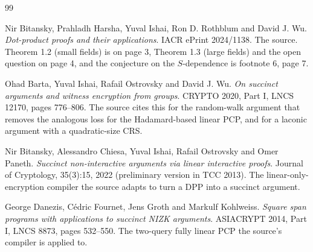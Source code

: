\documentclass{aicr-conjecture}
\begin{document}
\begin{aicrbibliography}{99}

Nir Bitansky, Prahladh Harsha, Yuval Ishai, Ron D. Rothblum and
David J. Wu.
\emph{Dot-product proofs and their applications}.
IACR ePrint 2024/1138.
The source. Theorem 1.2 (small fields) is on page 3, Theorem 1.3 (large
fields) and the open question on page 4, and the conjecture on the
$S$-dependence is footnote 6, page 7.

Ohad Barta, Yuval Ishai, Rafail Ostrovsky and David J. Wu.
\emph{On succinct arguments and witness encryption from groups}.
CRYPTO 2020, Part I, LNCS 12170, pages 776--806.
The source cites this for the random-walk argument that removes the
analogous loss for the Hadamard-based linear PCP, and for a laconic
argument with a quadratic-size CRS\@.

Nir Bitansky, Alessandro Chiesa, Yuval Ishai, Rafail Ostrovsky and Omer
Paneth.
\emph{Succinct non-interactive arguments via linear interactive proofs}.
Journal of Cryptology, 35(3):15, 2022 (preliminary version in TCC 2013).
The linear-only-encryption compiler the source adapts to turn a DPP into
a succinct argument.

George Danezis, C\'edric Fournet, Jens Groth and Markulf Kohlweiss.
\emph{Square span programs with applications to succinct NIZK
arguments}.
ASIACRYPT 2014, Part I, LNCS 8873, pages 532--550.
The two-query fully linear PCP the source's compiler is applied to.

\end{aicrbibliography}
\end{document}
